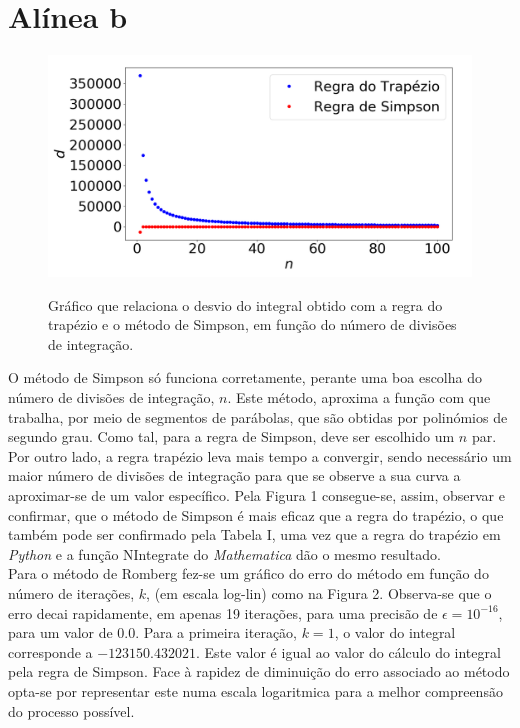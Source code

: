 \documentclass[aps,pre,twocolumn,showpacs,amsmath,amssymb]{revtex4-1}
\begin{document}
\section*{Alínea b}

\begin{figure}[h!]
   \begin{center}
    \includegraphics[width=\columnwidth]{desviointegralporiter.png} \\
\caption{Gráfico que relaciona o desvio do integral obtido com a regra do trapézio e o método de Simpson, em função do número de divisões de integração.}
  \label{fig.exemplo}
   \end{center}
  \end{figure}


O método de Simpson só funciona corretamente, perante uma boa escolha do número de divisões de integração, $n$. Este método, aproxima a função com que trabalha, por meio de segmentos de parábolas, que são obtidas por polinómios de segundo grau. Como tal, para a regra de Simpson, deve ser escolhido um $n$ par.
Por outro lado, a regra trapézio leva mais tempo a convergir, sendo necessário um maior número de divisões de integração para que se observe a sua curva a aproximar-se de um valor específico.
Pela Figura 1 consegue-se, assim, observar e confirmar, que o método de Simpson é mais eficaz que a regra do trapézio, o que também pode ser confirmado pela Tabela I, uma vez que a regra do trapézio em \textit{Python} e a função NIntegrate do \textit{Mathematica} dão o mesmo resultado.\\

Para o método de Romberg fez-se um gráfico do erro do método em função do número de iterações, $k$, (em escala log-lin) como na Figura 2. Observa-se que o erro decai rapidamente, em apenas 19 iterações, para uma precisão de $\epsilon=10^{-16}$, para um valor de $0.0$. Para a primeira iteração, $k=1$, o valor do integral corresponde a $-123150.432021$. Este valor é igual ao valor do cálculo do integral pela regra de Simpson.
Face à rapidez de diminuição do erro associado ao método opta-se por representar este numa escala logaritmica para a melhor compreensão do processo possível.
\end{document}
